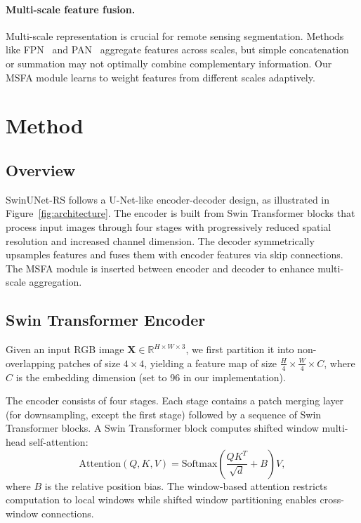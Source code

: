 \documentclass[conference]{IEEEtran}
\begin{document}
\paragraph{Multi-scale feature fusion.}
Multi-scale representation is crucial for remote sensing segmentation.
Methods like FPN~\cite{lin2017fpn} and PAN~\cite{liu2018pan} aggregate features across scales,
but simple concatenation or summation may not optimally combine complementary information.
Our MSFA module learns to weight features from different scales adaptively.

\section{Method}\label{sec:method}

\subsection{Overview}\label{sec:overview}

SwinUNet-RS follows a U-Net-like encoder-decoder design, as illustrated in Figure~\ref{fig:architecture}.
The encoder is built from Swin Transformer blocks that process input images through four stages
with progressively reduced spatial resolution and increased channel dimension.
The decoder symmetrically upsamples features and fuses them with encoder features via skip connections.
The MSFA module is inserted between encoder and decoder to enhance multi-scale aggregation.

\subsection{Swin Transformer Encoder}\label{sec:encoder}

Given an input RGB image $\mathbf{X} \in \mathbb{R}^{H \times W \times 3}$,
we first partition it into non-overlapping patches of size $4 \times 4$,
yielding a feature map of size $\frac{H}{4} \times \frac{W}{4} \times C$,
where $C$ is the embedding dimension (set to 96 in our implementation).

The encoder consists of four stages. Each stage contains a patch merging layer
(for downsampling, except the first stage) followed by a sequence of Swin Transformer blocks.
A Swin Transformer block computes shifted window multi-head self-attention:
\begin{equation}
\text{Attention}(Q, K, V) = \text{Softmax}\left(\frac{QK^T}{\sqrt{d}} + B\right)V,
\end{equation}
where $B$ is the relative position bias. The window-based attention restricts computation
to local windows while shifted window partitioning enables cross-window connections.
\end{document}
